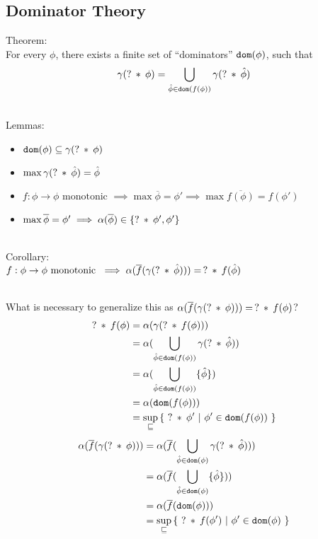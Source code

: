 \documentclass[11pt,a4paper]{article}
\begin{document}
\subsection{Dominator Theory}
Theorem:\\
For every $\phi$, there exists a finite set of “dominators” $\texttt{dom}(\phi)$, such that 
$$\gamma(?\:*\:\phi) = \bigcup_{\hat{\phi} \in \texttt{dom}(f(\phi))} \gamma(?\:*\:\hat{\phi})$$

~\\
Lemmas:
\begin{itemize}
    \item $\texttt{dom}(\phi) \subseteq \gamma(?\:*\:\phi)$
    \item $\max \gamma(?\:*\:\hat{\phi}) = \hat{\phi}$
    \item $f : \phi \rightarrow \phi \text{ monotonic }  \implies  \max \overline{\phi} = \phi'  \implies  \max \overline{f(\phi)} = f(\phi')$
    \item $\max \overline{\phi} = \phi'  \implies  \alpha(\overline{\phi}) \in \{ ?\:*\:\phi', \phi' \}$
\end{itemize}

~\\
Corollary:\\
$f : \phi \rightarrow \phi \text{ monotonic }  \implies  \alpha(\overline{f}(\gamma(?\:*\:\hat{\phi}))) =\, ?\:*\:f(\hat{\phi})$


~\\
What is necessary to generalize this as $\alpha(\overline{f}(\gamma(?\:*\:\phi))) =\, ?\:*\:f(\phi)$?
\begin{align*}
?\:*\:f(\phi) 
&= \alpha(\gamma(?\:*\:f(\phi))) \\
&= \alpha(\bigcup_{\hat{\phi} \in \texttt{dom}(f(\phi))} \gamma(?\:*\:\hat{\phi})) \\
&= \alpha(\bigcup_{\hat{\phi} \in \texttt{dom}(f(\phi))} \{ \hat{\phi} \}) \\
&= \alpha(\texttt{dom}(f(\phi))) \\
&= \sup_{\sqsubseteq} {\{~ ?\:*\:\phi' ~|~ \phi' \in \texttt{dom}(f(\phi)) ~\}} \\
\end{align*}
\begin{align*}
\alpha(\overline{f}(\gamma(?\:*\:\phi))) 
&= \alpha(\overline{f}(\bigcup_{\hat{\phi} \in \texttt{dom}(\phi)} \gamma(?\:*\:\hat{\phi}))) \\
&= \alpha(\overline{f}(\bigcup_{\hat{\phi} \in \texttt{dom}(\phi)} \{ \hat{\phi} \})) \\
&= \alpha(\overline{f}(\texttt{dom}(\phi))) \\
&= \sup_{\sqsubseteq} {\{~ ?\:*\:f(\phi') ~|~ \phi' \in \texttt{dom}(\phi) ~\}} \\
\end{align*}
\end{document}
